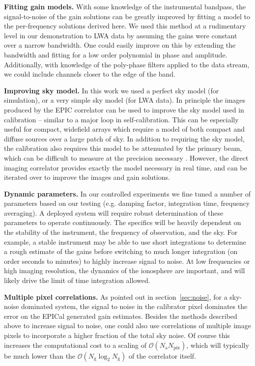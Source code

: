 \documentclass[a4paper,fleqn,usenatbib]{../mnras}
\newcommand{\Nant}{\ensuremath{N_{\mathrm{a}}}}
\newcommand{\Ng}{\ensuremath{N_{\mathrm{g}}}}
\begin{document}
\textbf{Fitting gain models.} With some knowledge of the instrumental bandpass, the signal-to-noise of the gain solutions can be greatly improved by fitting a model to the per-frequency solutions derived here. We used this method at a rudimentary level in our demonstration to LWA data by assuming the gains were constant over a narrow bandwidth. One could easily improve on this by extending the bandwidth and fitting for a low order polynomial in phase and amplitude. Additionally, with knowledge of the poly-phase filters applied to the data stream, we could include channels closer to the edge of the band.

\textbf{Improving sky model.} In this work we used a perfect sky model (for simulation), or a very simple sky model (for LWA data). In principle the images produced by the EPIC correlator can be used to improve the sky model used in calibration -- similar to a major loop in self-calibration. This can be especially useful for compact, widefield arrays which require a model of both compact and diffuse sources over a large patch of sky. In addition to requiring the sky model, the calibration also requires this model to be attenuated by the primary beam, which can be difficult to measure at the precision necessary \citep[e.g.][]{neb15,vir14,thy15b}. However, the direct imaging correlator provides exactly the model necessary in real time, and can be iterated over to improve the images and gain solutions.

\textbf{Dynamic parameters.} In our controlled experiments we fine tuned a number of parameters based on our testing (e.g. damping factor, integration time, frequency averaging). A deployed system will require robust determination of these parameters to operate continuously. The specifics will be heavily dependent on the stability of the instrument, the frequency of observation, and the sky. For example, a stable instrument may be able to use short integrations to determine a rough estimate of the gains before switching to much longer integration (on order seconds to minutes) to highly increase signal to noise. At low frequencies or high imaging resolution, the dynamics of the ionosphere are important, and will likely drive the limit of time integration allowed.

\textbf{Multiple pixel correlations.} As pointed out in section~\ref{sec:noise}, for a sky-noise dominated system, the signal to noise in the calibrator pixel dominates the error on the EPICal generated gain estimates. Besides the methods described above to increase signal to noise, one could also use correlations of multiple image pixels to incorporate a higher fraction of the total sky noise. Of course this increases the computational cost to a scaling of $\mathcal{O}(\Nant N_{\mathrm{pix}})$, which will typically be much lower than the $\mathcal{O}(\Ng \log_2 \Ng)$ of the correlator itself. 
\end{document}
